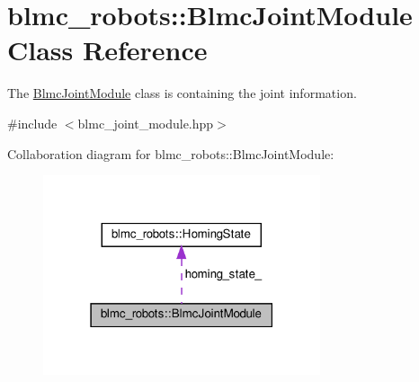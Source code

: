 \hypertarget{classblmc__robots_1_1BlmcJointModule}{}\section{blmc\+\_\+robots\+:\+:Blmc\+Joint\+Module Class Reference}
\label{classblmc__robots_1_1BlmcJointModule}


The \hyperlink{classblmc__robots_1_1BlmcJointModule}{Blmc\+Joint\+Module} class is containing the joint information.  




{\ttfamily \#include $<$blmc\+\_\+joint\+\_\+module.\+hpp$>$}



Collaboration diagram for blmc\+\_\+robots\+:\+:Blmc\+Joint\+Module\+:
\nopagebreak
\begin{figure}[H]
\begin{center}
\leavevmode
\includegraphics[width=231pt]{classblmc__robots_1_1BlmcJointModule__coll__graph}
\end{center}
\end{figure}
